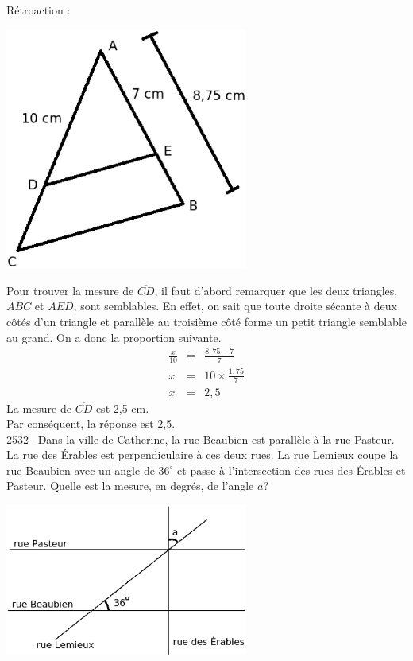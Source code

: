 \documentclass[letterpaper, 12pt]{article}
\begin{document}
R\'etroaction :\\
\begin{center}
 \includegraphics[width=8cm,bb=0 439 538 842]{Q2531.eps}
\end{center}
Pour trouver la mesure de $\overline{CD}$, il faut d'abord remarquer que les deux triangles, $ABC$ et $AED$, sont semblables. En effet, on sait que toute droite s\'ecante \`a deux c\^ot\'es d'un triangle et parall\`ele au troisi\`eme c\^ot\'e forme un petit triangle semblable au grand. On a donc la proportion suivante.
\begin{eqnarray*}
 \frac{x}{10}&=&\frac{8,75-7}{7}\\[2mm]
 x&=&10 \times \frac{1,75}{7}\\[2mm]
x&=&2,5
\end{eqnarray*}
La mesure de $\overline{CD}$ est 2,5 cm.\\
Par cons\'equent, la r\'eponse est 2,5.\\


2532-- Dans la ville de Catherine, la rue Beaubien est parall\`ele \`a la rue Pasteur. La rue des \'Erables est perpendiculaire \`a ces deux rues. La rue Lemieux coupe la rue Beaubien avec un angle de $36^{\circ}$ et passe \`a l'intersection des rues des \'Erables et Pasteur. Quelle est la mesure, en degr\'es, de l'angle $a$? \\
\begin{center}
 \includegraphics[width=8cm,bb=0 474 591 842]{Q2532.eps}
\end{center}
\end{document}
